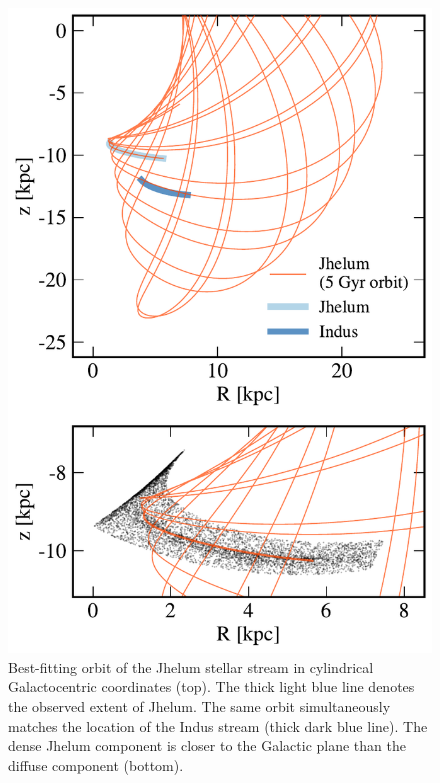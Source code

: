 \documentclass[twocolumn]{aastex62}
\begin{document}
\begin{figure}
\begin{center}
\includegraphics[width=\columnwidth]{orbit_cyl.pdf}
\end{center}
\caption{
Best-fitting orbit of the Jhelum stellar stream in cylindrical Galactocentric coordinates (top).
The thick light blue line denotes the observed extent of Jhelum.
The same orbit simultaneously matches the location of the Indus stream (thick dark blue line).
The dense Jhelum component is closer to the Galactic plane than the diffuse component (bottom).
}
\label{fig:galactocentric}
\end{figure}
\end{document}
